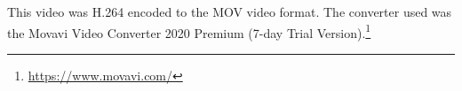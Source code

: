 \documentclass{article}
\begin{document}
\maketitle

\begin{center}
\end{center}
This video was H.264 encoded to the MOV video format. The converter used
was the Movavi Video Converter 2020 Premium (7-day Trial Version).\footnote{\url{https://www.movavi.com/}}
\end{document}
